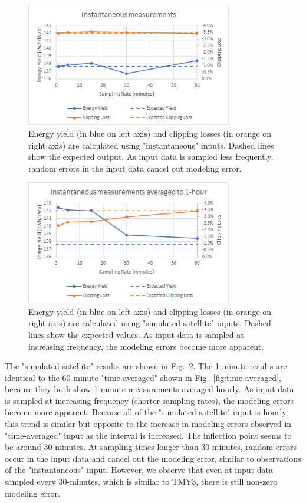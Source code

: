 \documentclass[conference]{IEEEtran}
\begin{document}
\begin{figure}[htbp]
\centerline{\includegraphics[width=9cm]{instantaneous.png}}
\caption{Energy yield (in blue on left axis) and clipping losses (in orange on right axis) are calculated using "instantaneous" inputs. Dashed lines show the expected output. As input data is sampled less frequently, random errors in the input data cancel out modeling error.}
\label{fig:instantaneous}
\end{figure}

\begin{figure}[htbp]
\centerline{\includegraphics[width=9cm]{satellite-simulated.png}}
\caption{Energy yield (in blue on left axis) and clipping losses (in orange on right axis) are calculated using "simulated-satellite" inputs. Dashed lines show the expected values. As input data is sampled at increasing frequency, the modeling errors become more apparent.}
\label{fig:satellite-simulated}
\end{figure}

The "simulated-satellite" results are shown in Fig.~\ref{fig:satellite-simulated}. The 1-minute results are identical to the 60-minute "time-averaged" shown in Fig.~\ref{fig:time-averaged}, because they both show 1-minute measurements averaged hourly. As input data is sampled at increasing frequency (shorter sampling rates), the modeling errors become more apparent. Because all of the "simulated-satellite" input is hourly, this trend is similar but opposite to the increase in modeling errors observed in "time-averaged" input as the interval is increased. The inflection point seems to be around 30-minutes. At sampling times longer than 30-minutes, random errors occur in the input data and cancel out the modeling error, similar to observations of the "instantaneous" input. However, we observe that even at input data sampled every 30-minutes, which is similar to TMY3, there is still non-zero modeling error.
\end{document}
